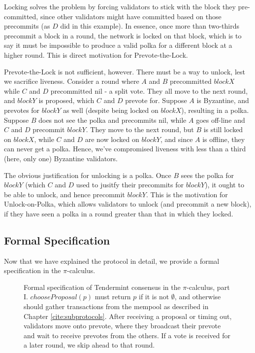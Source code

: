 Locking solves the problem by forcing validators to stick with the block they pre-committed, 
since other validators might have committed based on those precommits (as $D$ did in this example).
In essence, once more than two-thirds precommit a block in a round, the network is locked on that block,
which is to say it must be impossible to produce a valid polka for a different block at a higher round.
This is direct motivation for Prevote-the-Lock.

Prevote-the-Lock is not sufficient, however. 
There must be a way to unlock, lest we sacrifice liveness.
Consider a round where $A$ and $B$ precommitted $blockX$ while $C$ and $D$ precommitted nil - a split vote.
They all move to the next round, and $blockY$ is proposed, which $C$ and $D$ prevote for.
Suppose $A$ is Byzantine, and prevotes for $blockY$ as well (despite being locked on $blockX$), resulting in a polka.
Suppose $B$ does not see the polka and precommits nil, while $A$ goes off-line and $C$ and $D$ precommit $blockY$. 
They move to the next round, but $B$ is still locked on $blockX$, while $C$ and $D$ are now locked on $blockY$, 
and since $A$ is offline, they can never get a polka. 
Hence, we've compromised liveness with less than a third (here, only one) Byzantine validators.

The obvious justification for unlocking is a polka. 
Once $B$ sees the polka for $blockY$ (which $C$ and $D$ used to jusitfy their precommits for $blockY$), 
it ought to be able to unlock, and hence precommit $blockY$.
This is the motivation for Unlock-on-Polka, 
which allows validators to unlock (and precommit a new block),
if they have seen a polka in a round greater than that in which they locked.

\subsection{Formal Specification}

Now that we have explained the protocol in detail, 
we provide a formal specification in the $\pi$-calculus.

\begin{figure}[]
    	\centering
	
	\caption[Formal specification of Tendermint consensus in the $\pi$-calculus, part I]{Formal specification of Tendermint consensus in the $\pi$-calculus, part I.
$chooseProposal(p)$ must return $p$ if it is not $\emptyset$, and otherwise should gather transactions from the mempool as described in Chapter \ref{cite:subprotocols}. 
After receiving a proposal or timing out, validators move onto prevote,
where they broadcast their prevote and wait to receive prevotes from the others.
If a vote is received for a later round, we skip ahead to that round.
 }
	\label{fig:tendermint_pi1}
\end{figure}

